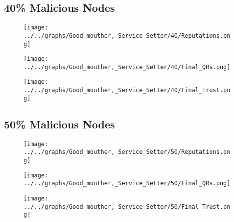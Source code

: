 \begin{minipage}[t]{0.49\columnwidth}
\subsection*{40\% Malicious Nodes}
    \begin{figure}[H]
        \centering
        \texttt{[image: ../../graphs/Good\_mouther,\_Service\_Setter/40/Reputations.png]}
    \end{figure}
    \begin{figure}[H]
        \centering
        \texttt{[image: ../../graphs/Good\_mouther,\_Service\_Setter/40/Final\_QRs.png]}
    \end{figure}
\end{minipage}
\begin{minipage}[t]{0.49\columnwidth}
    \begin{figure}[H]
        \centering
        \texttt{[image: ../../graphs/Good\_mouther,\_Service\_Setter/40/Final\_Trust.png]}
    \end{figure}
\end{minipage}

\begin{minipage}[t]{0.49\columnwidth}
\subsection*{50\% Malicious Nodes}
    \begin{figure}[H]
        \centering
        \texttt{[image: ../../graphs/Good\_mouther,\_Service\_Setter/50/Reputations.png]}
    \end{figure}
    \begin{figure}[H]
        \centering
        \texttt{[image: ../../graphs/Good\_mouther,\_Service\_Setter/50/Final\_QRs.png]}
    \end{figure}
\end{minipage}
\begin{minipage}[t]{0.49\columnwidth}
    \begin{figure}[H]
        \centering
        \texttt{[image: ../../graphs/Good\_mouther,\_Service\_Setter/50/Final\_Trust.png]}
    \end{figure}
\end{minipage}

